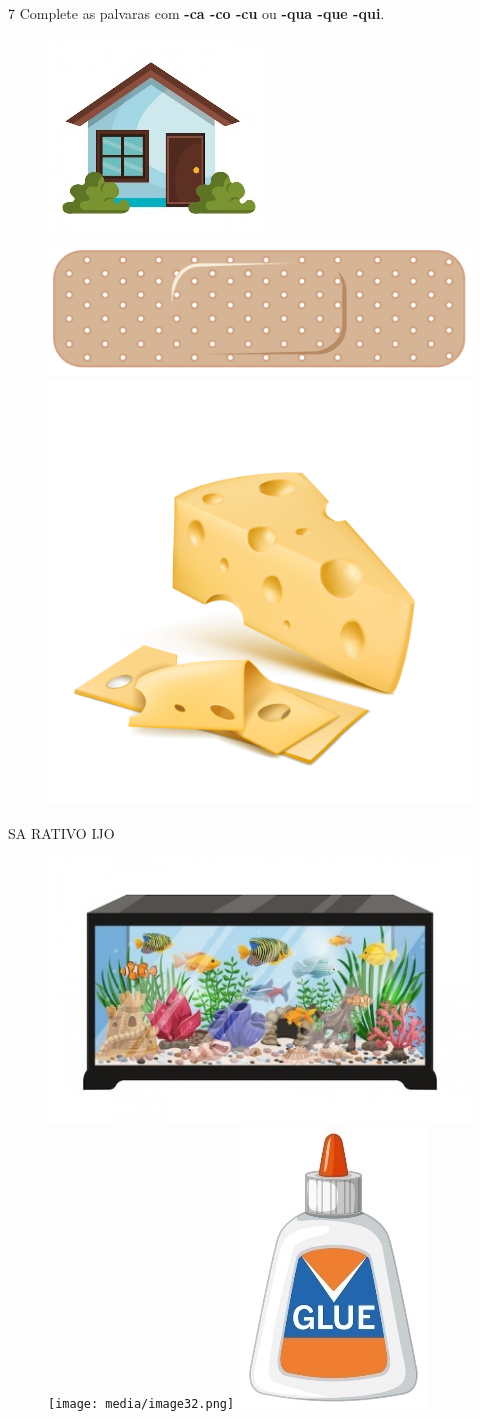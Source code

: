 \num{7} Complete as palvaras com \textbf{-ca -co -cu} ou \textbf{-qua -que -qui}.


\begin{figure}[H]
\centering
\includegraphics[width=.26\textwidth]{media/image27.jpeg}
\includegraphics[width=.26\textwidth]{media/image28.png}
\includegraphics[width=.26\textwidth]{media/image29.jpg}
\end{figure}

\begin{center}
 SA \hspace{2cm}  RATIVO \hspace{2cm}  IJO
\end{center}

\vspace{-2,5em}

\begin{figure}[H]
\centering
\includegraphics[width=.3\textwidth]{media/image30.jpeg}
\texttt{[image: media/image32.png]}
\includegraphics[width=.2\textwidth]{media/image33.jpeg}
\end{figure}

